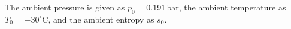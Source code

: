 The ambient pressure is given as \( p_0 = 0.191 \, \text{bar} \), the ambient temperature as \( T_0 = -30^\circ\text{C} \), and the ambient entropy as \( s_0 \).